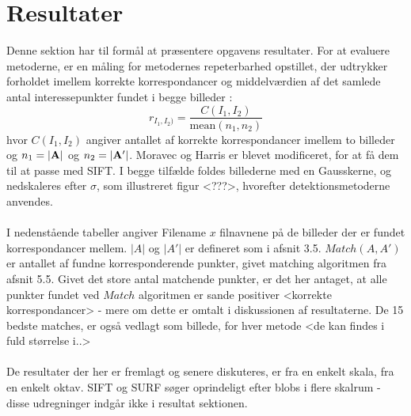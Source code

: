 \chapter{Resultater}
\label{sec:resultater}
Denne sektion har til formål at præsentere opgavens resultater. For at evaluere metoderne, er en måling for metodernes repeterbarhed opstillet, der udtrykker forholdet imellem korrekte korrespondancer og middelværdien af det samlede antal interessepunkter fundet i begge billeder \cite{eval}:
\begin{equation}
r_{I_1,I_2)}=\dfrac{C(I_1,I_2)}{\text{mean}(n_1,n_2)}
\end{equation}
hvor $C(I_1,I_2)$ angiver antallet af korrekte korrespondancer imellem to billeder og $n_1=\bold{|A|}$ og $n_2=\bold{|A'|}$.
Moravec og Harris er blevet modificeret, for at få dem til at passe med SIFT. I begge tilfælde foldes billederne med en Gausskerne, og nedskaleres efter $\sigma$, som illustreret figur <???>, hvorefter detektionsmetoderne anvendes. 
\\
\\
I nedenstående tabeller angiver Filename $x$ filnavnene på de billeder der er fundet korrespondancer mellem. $|A|$ og $|A'|$ er defineret som i afsnit 3.5. $Match(A, A')$ er antallet af fundne korresponderende punkter, givet matching algoritmen fra afsnit 5.5. Givet det store antal matchende punkter, er det her antaget, at alle punkter fundet ved $Match$ algoritmen er sande positiver <korrekte korrespondancer> - mere om dette er omtalt i diskussionen af resultaterne. De 15 bedste matches, er også vedlagt som billede, for hver metode <de kan findes i fuld størrelse i..>
\\
\\
De resultater der her er fremlagt og senere diskuteres, er fra en enkelt skala, fra en enkelt oktav. SIFT og SURF søger oprindeligt efter blobs i flere skalrum - disse udregninger indgår ikke i resultat sektionen. 
